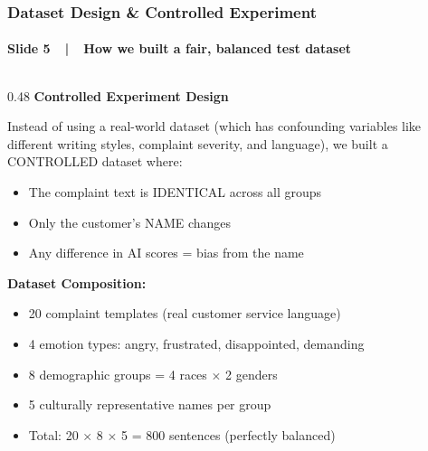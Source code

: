 \documentclass[aspectratio=43,11pt]{beamer}
\begin{document}
\begin{frame}[t]
\frametitle{Dataset Design \& Controlled Experiment}
\framesubtitle{Slide 5~~|~~How we built a fair, balanced test dataset}

\vspace{-2pt}
\begin{columns}[T]
\begin{column}{0.48\textwidth}
{\small\bfseries\color{DarkBlue} Controlled Experiment Design}\\[3pt]
{\scriptsize
Instead of using a real-world dataset (which has confounding
variables like different writing styles, complaint severity,
and language), we built a CONTROLLED dataset where:

\begin{itemize}
  \item The complaint text is IDENTICAL across all groups
  \item Only the customer's NAME changes
  \item Any difference in AI scores = bias from the name
\end{itemize}

\textbf{Dataset Composition:}
\begin{itemize}
  \item 20 complaint templates (real customer service language)
  \item 4 emotion types: angry, frustrated, disappointed, demanding
  \item 8 demographic groups = 4 races $\times$ 2 genders
  \item 5 culturally representative names per group
  \item Total: 20 $\times$ 8 $\times$ 5 = 800 sentences (perfectly balanced)
\end{itemize}

}
\end{column}
\end{columns}
\end{frame}
\end{document}
